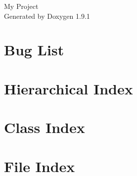 \let\mypdfximage\pdfximage\def\pdfximage{\immediate\mypdfximage}\documentclass[twoside]{book}
\newcommand{\+}{\discretionary{\mbox{\scriptsize$\hookleftarrow$}}{}{}}
\newcommand{\clearemptydoublepage}{%
  \newpage{\pagestyle{empty}\cleardoublepage}%
}
\begin{document}
\raggedbottom

\hypersetup{pageanchor=false,
             bookmarksnumbered=true,
             pdfencoding=unicode
            }
\begin{titlepage}
\vspace*{7cm}
\begin{center}%
{\Large My Project }\\
\vspace*{1cm}
{\large Generated by Doxygen 1.9.1}\\
\end{center}
\end{titlepage}
\clearemptydoublepage
{}
\tableofcontents
\clearemptydoublepage
{}
\hypersetup{pageanchor=true}

\chapter{Bug List}
\label{bug}

\chapter{Hierarchical Index}

\chapter{Class Index}

\chapter{File Index}

\end{document}
